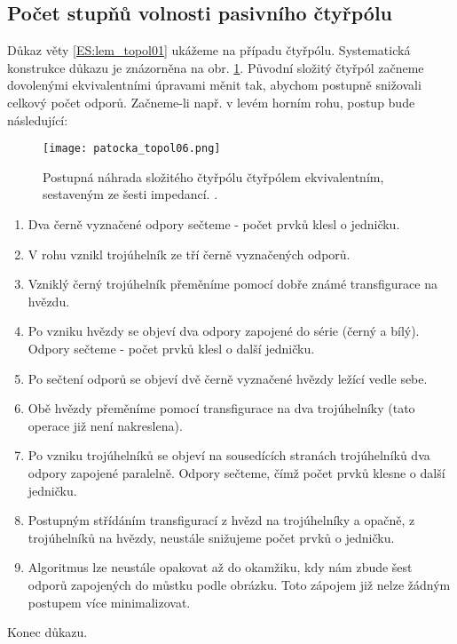     \subsection{Počet stupňů volnosti pasivního čtyřpólu}\label{teo:IchapIIsecIsubV}
      Důkaz věty \ref{ES:lem_topol01} ukážeme na případu čtyřpólu. Systematická konstrukce důkazu 
      je znázorněna na obr. \ref{es:fig_patocka_topol06}. Původní složitý čtyřpól začneme 
      dovolenými ekvivalentními úpravami měnit tak, abychom postupně snižovali celkový počet 
      odporů. Začneme-li např. v levém horním rohu, postup bude následující:
      \begin{figure}[ht!]   %
        \centering
        \texttt{[image: patocka\_topol06.png]}
        \caption{Postupná náhrada složitého čtyřpólu čtyřpólem ekvivalentním, sestaveným ze šesti
                 impedancí. \cite[s.~48]{Patocka4}.}
        \label{es:fig_patocka_topol06}
      \end{figure}
      \begin{enumerate}\addtolength{\itemsep}{-0.5\baselineskip}
        \item Dva černě vyznačené odpory sečteme - počet prvků klesl o jedničku.
        \item V rohu vznikl trojúhelník ze tří černě vyznačených odporů.        
        \item Vzniklý černý trojúhelník přeměníme pomocí dobře známé transfigurace na hvězdu.
        \item Po vzniku hvězdy se objeví dva odpory zapojené do série (černý a bílý). Odpory 
              sečteme - počet prvků klesl o další jedničku.
        \item Po sečtení odporů se objeví dvě černě vyznačené hvězdy ležící vedle sebe.
        \item Obě hvězdy přeměníme pomocí transfigurace na dva trojúhelníky (tato operace již není 
              nakreslena).
        \item Po vzniku trojúhelníků se objeví na sousedících stranách trojúhelníků dva odpory 
              zapojené paralelně. Odpory sečteme, čímž počet prvků klesne o další jedničku.
        \item Postupným střídáním transfigurací z hvězd na trojúhelníky a opačně, z trojúhelníků na 
              hvězdy, neustále snižujeme počet prvků o jedničku.
        \item Algoritmus lze neustále opakovat až do okamžiku, kdy nám zbude šest odporů zapojených 
              do můstku podle obrázku. Toto zápojem již nelze žádným postupem více minimalizovat.
      \end{enumerate}
      Konec důkazu.
      
